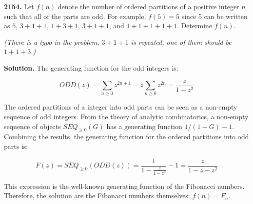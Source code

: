 \documentclass{letter}
\begin{document}
\newtheorem{lemma}{Lemma}

\begin{letter}{}

  \textbf{2154.} Let $f(n)$ denote the number of ordered partitions of a positive integer $n$ such that all of the parts are odd. For example, $f(5)=5$ since 5 can be written as $5$, $3+1+1$, $1+3+1$, $3+1+1$, and $1+1+1+1+1$. Determine $f(n)$.

  \textit{(There is a typo in the problem, $3+1+1$ is repeated, one of them should be $1+1+3$.)} 

  \textbf{Solution.} The generating function for the odd integers is:

  $$ODD(z)=\sum_{n\ge 0}z^{2n+1}=z\sum_{n\ge 0}z^{2n}=\frac{z}{1-z^2}$$

  The ordered partitions of a integer into odd parts can be seen as a non-empty sequence of odd integers. From the theory of analytic combinatorics, a non-empty sequence of objects $SEQ_{\ge 0}(G)$ has a generating function $1/(1-G)-1$. Combining the results, the generating function for the ordered partitions into odd parts is:

  $$F(z)=SEQ_{\ge 0}(ODD(z))=\frac{1}{1-\frac{z}{1-z^2}}-1=\frac{z}{1-z-z^2}$$

  This expression is the well-known generating function of the Fibonacci numbers. Therefore, the solution are the Fibonacci numbers themselves: $f(n)=F_n$.

\end{letter}
\end{document}
